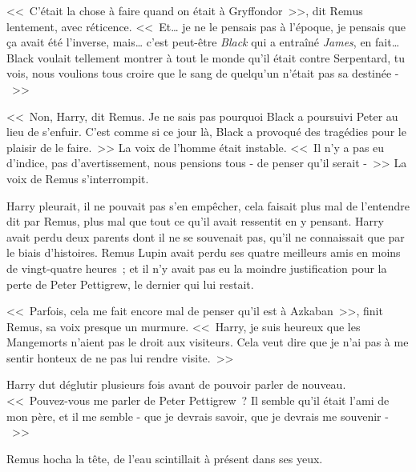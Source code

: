 <<~C'était la chose à faire quand on était à Gryffondor~>>, dit Remus lentement, avec réticence. <<~Et… je ne le pensais pas à l'époque, je pensais que ça avait été l'inverse, mais… c'est peut-être \emph{Black} qui a entraîné \emph{James}, en fait… Black voulait tellement montrer à tout le monde qu'il était contre Serpentard, tu vois, nous voulions tous croire que le sang de quelqu'un n'était pas sa destinée -~>>

\later

<<~Non, Harry, dit Remus. Je ne sais pas pourquoi Black a poursuivi Peter au lieu de s'enfuir. C'est comme si ce jour là, Black a provoqué des tragédies pour le plaisir de le faire.~>> La voix de l'homme était instable. <<~Il n'y a pas eu d'indice, pas d'avertissement, nous pensions tous - de penser qu'il serait -~>> La voix de Remus s'interrompit.

Harry pleurait, il ne pouvait pas s'en empêcher, cela faisait plus mal de l'entendre dit par Remus, plus mal que tout ce qu'il avait ressentit en y pensant. Harry avait perdu deux parents dont il ne se souvenait pas, qu'il ne connaissait que par le biais d'histoires. Remus Lupin avait perdu ses quatre meilleurs amis en moins de vingt-quatre heures~; et il n'y avait pas eu la moindre justification pour la perte de Peter Pettigrew, le dernier qui lui restait.

<<~Parfois, cela me fait encore mal de penser qu'il est à Azkaban~>>, finit Remus, sa voix presque un murmure. <<~Harry, je suis heureux que les Mangemorts n'aient pas le droit aux visiteurs. Cela veut dire que je n'ai pas à me sentir honteux de ne pas lui rendre visite.~>>

Harry dut déglutir plusieurs fois avant de pouvoir parler de nouveau. <<~Pouvez-vous me parler de Peter Pettigrew~? Il semble qu'il était l'ami de mon père, et il me semble - que je devrais savoir, que je devrais me souvenir -~>>

Remus hocha la tête, de l'eau scintillait à présent dans ses yeux.

